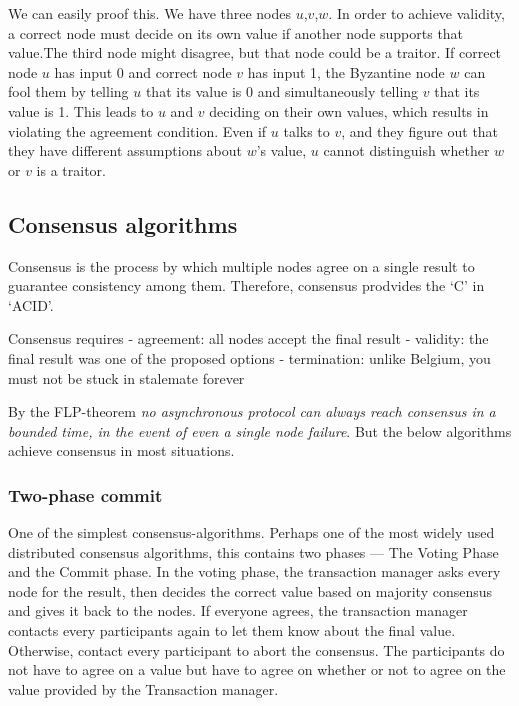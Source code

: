 We can easily proof this. We have three nodes \(u\),\(v\),\(w\). In
order to achieve validity, a correct node must decide on its own value
if another node supports that value.The third node might disagree, but
that node could be a traitor. If correct node \(u\) has input 0 and
correct node \(v\) has input 1, the Byzantine node \(w\) can fool them
by telling \(u\) that its value is 0 and simultaneously telling \(v\)
that its value is 1. This leads to \(u\) and \(v\) deciding on their own
values, which results in violating the agreement condition. Even if
\(u\) talks to \(v\), and they figure out that they have different
assumptions about \(w\)'s value, \(u\) cannot distinguish whether \(w\)
or \(v\) is a traitor.

\hypertarget{consensus-algorithms}{%
\subsection{Consensus algorithms}\label{consensus-algorithms}}

Consensus is the process by which multiple nodes agree on a single
result to guarantee consistency among them. Therefore, consensus
prodvides the `C' in `ACID'.

Consensus requires - agreement: all nodes accept the final result -
validity: the final result was one of the proposed options -
termination: unlike Belgium, you must not be stuck in stalemate forever

By the FLP-theorem \emph{no asynchronous protocol can always reach
consensus in a bounded time, in the event of even a single node
failure}. But the below algorithms achieve consensus in most situations.

\hypertarget{two-phase-commit}{%
\subsubsection{Two-phase commit}\label{two-phase-commit}}

One of the simplest consensus-algorithms. Perhaps one of the most widely
used distributed consensus algorithms, this contains two phases --- The
Voting Phase and the Commit phase. In the voting phase, the transaction
manager asks every node for the result, then decides the correct value
based on majority consensus and gives it back to the nodes. If everyone
agrees, the transaction manager contacts every participants again to let
them know about the final value. Otherwise, contact every participant to
abort the consensus. The participants do not have to agree on a value
but have to agree on whether or not to agree on the value provided by
the Transaction manager.

